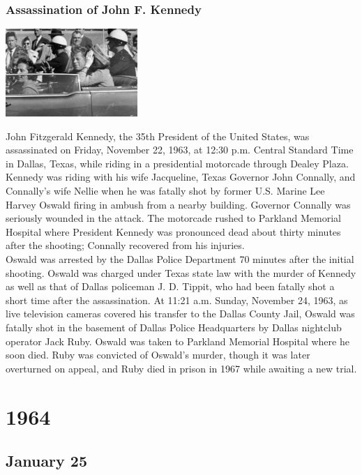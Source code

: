 \documentclass[11pt]{report}
\begin{document}
\subsection{Assassination of John F. Kennedy}
\vspace{2mm}\begin{center}\includegraphics[width=5cm]{./img/jfk.jpg}\end{center}
John Fitzgerald Kennedy, the 35th President of the United States, was assassinated on Friday, November 22, 1963, at 12:30 p.m. Central Standard Time in Dallas, Texas, while riding in a presidential motorcade through Dealey Plaza. Kennedy was riding with his wife Jacqueline, Texas Governor John Connally, and Connally's wife Nellie when he was fatally shot by former U.S. Marine Lee Harvey Oswald firing in ambush from a nearby building. Governor Connally was seriously wounded in the attack. The motorcade rushed to Parkland Memorial Hospital where President Kennedy was pronounced dead about thirty minutes after the shooting; Connally recovered from his injuries.\\
\indent Oswald was arrested by the Dallas Police Department 70 minutes after the initial shooting. Oswald was charged under Texas state law with the murder of Kennedy as well as that of Dallas policeman J. D. Tippit, who had been fatally shot a short time after the assassination. At 11:21 a.m. Sunday, November 24, 1963, as live television cameras covered his transfer to the Dallas County Jail, Oswald was fatally shot in the basement of Dallas Police Headquarters by Dallas nightclub operator Jack Ruby. Oswald was taken to Parkland Memorial Hospital where he soon died. Ruby was convicted of Oswald's murder, though it was later overturned on appeal, and Ruby died in prison in 1967 while awaiting a new trial.

\chapter{1964}
\section{January 25}
\end{document}
